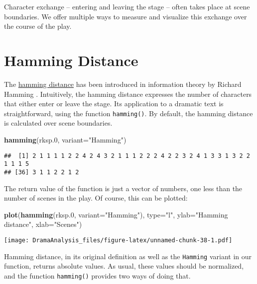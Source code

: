 \documentclass[]{book}
\newenvironment{Shaded}{\begin{snugshade}}{\end{snugshade}}
\newcommand{\DataTypeTok}[1]{\textcolor[rgb]{0.13,0.29,0.53}{#1}}
\newcommand{\FloatTok}[1]{\textcolor[rgb]{0.00,0.00,0.81}{#1}}
\newcommand{\KeywordTok}[1]{\textcolor[rgb]{0.13,0.29,0.53}{\textbf{#1}}}
\newcommand{\NormalTok}[1]{#1}
\newcommand{\StringTok}[1]{\textcolor[rgb]{0.31,0.60,0.02}{#1}}
\begin{document}
Character exchange -- entering and leaving the stage -- often takes place at scene boundaries. We offer multiple ways to measure and visualize this exchange over the course of the play.

\hypertarget{hamming-distance}{%
\section{Hamming Distance}\label{hamming-distance}}

The \href{https://en.wikipedia.org/wiki/Hamming_distance}{hamming distance} has been introduced in information theory by Richard Hamming \citep{Hamming:1950aa}. Intuitively, the hamming distance expresses the number of characters that either enter or leave the stage. Its application to a dramatic text is straightforward, using the function \texttt{hamming()}. By default, the hamming distance is calculated over scene boundaries.

\begin{Shaded}
\begin{Highlighting}[]
\KeywordTok{hamming}\NormalTok{(rksp}\FloatTok{.0}\NormalTok{, }\DataTypeTok{variant=}\StringTok{"Hamming"}\NormalTok{)}
\end{Highlighting}
\end{Shaded}

\begin{verbatim}
##  [1] 2 1 1 1 1 2 2 4 2 4 3 2 1 1 1 2 2 2 4 2 2 3 2 4 1 3 3 1 3 2 2 1 1 1 5
## [36] 3 1 1 2 2 1 2
\end{verbatim}

The return value of the function is just a vector of numbers, one less than the number of scenes in the play. Of course, this can be plotted:

\begin{Shaded}
\begin{Highlighting}[]
\KeywordTok{plot}\NormalTok{(}\KeywordTok{hamming}\NormalTok{(rksp}\FloatTok{.0}\NormalTok{, }\DataTypeTok{variant=}\StringTok{"Hamming"}\NormalTok{),}
     \DataTypeTok{type=}\StringTok{"l"}\NormalTok{,}
     \DataTypeTok{ylab=}\StringTok{"Hamming distance"}\NormalTok{,}
     \DataTypeTok{xlab=}\StringTok{"Scenes"}\NormalTok{)}
\end{Highlighting}
\end{Shaded}

\texttt{[image: DramaAnalysis\_files/figure-latex/unnamed-chunk-38-1.pdf]}

Hamming distance, in its original definition as well as the \texttt{Hamming} variant in our function, returns absolute values. As usual, these values should be normalized, and the function \texttt{hamming()} provides two ways of doing that.
\end{document}

